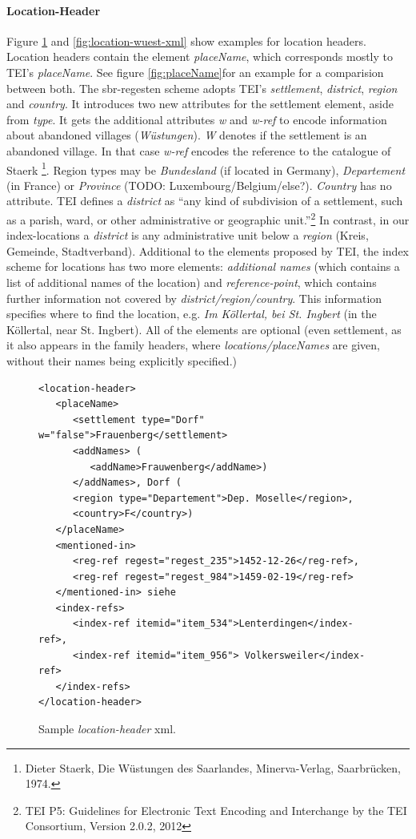 \paragraph{Location-Header}
Figure \ref{fig:location-header-xml} and \ref{fig:location-wuest-xml} show examples for location headers. Location headers contain the element \textit{placeName}, which corresponds mostly to TEI's \textit{placeName}. See figure \ref{fig:placeName}for an example for a comparision between both. The sbr-regesten scheme adopts TEI's \textit{settlement}, \textit{district}, \textit{region} and \textit{country}. It introduces two new attributes for the settlement element, aside from \textit{type}. It gets the additional attributes \textit{w} and \textit{w-ref} to encode information about abandoned villages (\textit{Wüstungen}). \textit{W} denotes if the settlement is an abandoned village. In that case \textit{w-ref} encodes the reference to the catalogue of Staerk \footnote{Dieter Staerk, Die Wüstungen des Saarlandes, Minerva-Verlag, Saarbrücken, 1974.}. Region types may be \textit{Bundesland} (if located in Germany), \textit{Departement} (in France) or \textit{Province} (TODO: Luxembourg/Belgium/else?). \textit{Country} has no attribute. TEI defines a \textit{district} as “any kind of subdivision of a settlement, such as a parish, ward, or other administrative or geographic unit.”\footnote{TEI P5: Guidelines for Electronic Text Encoding and Interchange by the TEI Consortium, Version 2.0.2, 2012} In contrast, in our index-locations a \textit{district} is any administrative unit below a \textit{region} (Kreis, Gemeinde, Stadtverband).
Additional to the elements proposed by TEI, the index scheme for locations has two more elements: \textit{additional names} (which contains a list of additional names of the location) and \textit{reference-point}, which contains further information not covered by\textit{ district/region/country}. This information specifies where to find the location, e.g. \textit{Im Köllertal, bei St. Ingbert} (in the Köllertal, near St. Ingbert). All of the elements are optional (even settlement, as it also appears in the family headers, where \textit{locations/placeNames} are given, without their names being explicitly specified.)   

\begin{figure}[H]
\begin{verbatim}
<location-header>
   <placeName>
      <settlement type="Dorf" w="false">Frauenberg</settlement>
      <addNames> (
         <addName>Frauwenberg</addName>)
      </addNames>, Dorf (
      <region type="Departement">Dep. Moselle</region>, 
      <country>F</country>) 
   </placeName>
   <mentioned-in>
      <reg-ref regest="regest_235">1452-12-26</reg-ref>, 
      <reg-ref regest="regest_984">1459-02-19</reg-ref>
   </mentioned-in> siehe 
   <index-refs>
      <index-ref itemid="item_534">Lenterdingen</index-ref>,
      <index-ref itemid="item_956"> Volkersweiler</index-ref>
   </index-refs>
</location-header>
\end{verbatim}
\label{fig:location-header-xml}
\caption{Sample \textit{location-header} xml.}
\end{figure}


